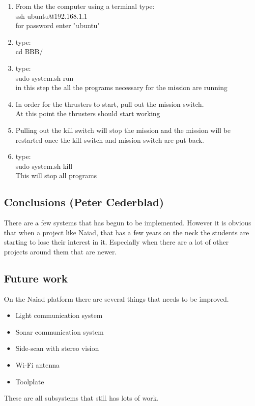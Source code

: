 \begin{enumerate}
  \item From the the computer using a terminal type: \\ssh ubuntu@192.168.1.1 \\for password enter "ubuntu"
  \item type:\\cd BBB/
  \item type: \\sudo system.sh run \\in this step the all the programs necessary for the mission are running
  \item In order for the thrusters to start, pull out the mission switch.\\At this point the thrusters should start working
  \item Pulling out the kill switch will stop the mission and the mission will be restarted once the kill switch and mission switch are put back.
  \item type:\\sudo system.sh kill \\This will stop all programs
\end{enumerate}

\subsection{Conclusions (Peter Cederblad)}
There are a few systems that has begun to be implemented. However it is obvious that when a project like Naiad, that has a few years on the neck the students are starting to lose their interest in it. Especially when there are a lot of other projects around them that are newer.

\subsection{Future work}
On the Naiad platform there are several things that needs to be improved.
\begin{itemize}
\item Light communication system
\item Sonar communication system
\item Side-scan with stereo vision
\item Wi-Fi antenna
\item Toolplate
\end{itemize}
These are all subsystems that still has lots of work.